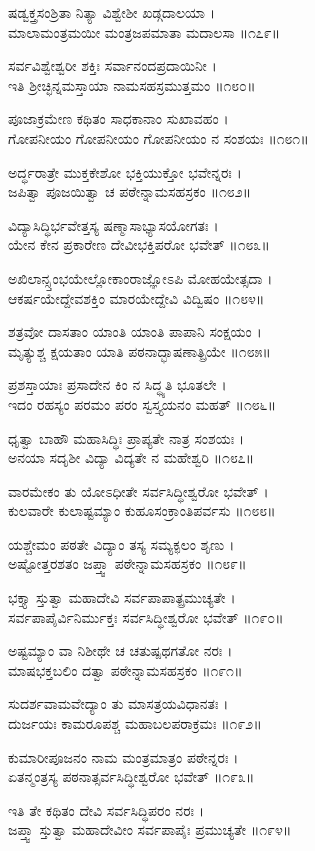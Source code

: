 ಷಡ್ವಕ್ತ್ರಸಂಶ್ರಿತಾ ನಿತ್ಯಾ ವಿಶ್ವೇಶೀ ಖಡ್ಗದಾಲಯಾ ।\\
ಮಾಲಾಮಂತ್ರಮಯೀ ಮಂತ್ರಜಪಮಾತಾ ಮದಾಲಸಾ ॥೧೭೯॥

ಸರ್ವವಿಶ್ವೇಶ್ವರೀ ಶಕ್ತಿಃ ಸರ್ವಾನಂದಪ್ರದಾಯಿನೀ ।\\
ಇತಿ ಶ್ರೀಚ್ಛಿನ್ನಮಸ್ತಾಯಾ ನಾಮಸಹಸ್ರಮುತ್ತಮಂ ॥೧೮೦॥

ಪೂಜಾಕ್ರಮೇಣ ಕಥಿತಂ ಸಾಧಕಾನಾಂ ಸುಖಾವಹಂ ।\\
ಗೋಪನೀಯಂ ಗೋಪನೀಯಂ ಗೋಪನೀಯಂ ನ ಸಂಶಯಃ ॥೧೮೧॥

ಅರ್ದ್ಧರಾತ್ರೇ ಮುಕ್ತಕೇಶೋ ಭಕ್ತಿಯುಕ್ತೋ ಭವೇನ್ನರಃ ।\\
ಜಪಿತ್ವಾ ಪೂಜಯಿತ್ವಾ ಚ ಪಠೇನ್ನಾಮಸಹಸ್ರಕಂ ॥೧೮೨॥

ವಿದ್ಯಾಸಿದ್ಧಿರ್ಭವೇತ್ತಸ್ಯ ಷಣ್ಮಾಸಾಭ್ಯಾಸಯೋಗತಃ ।\\
ಯೇನ ಕೇನ ಪ್ರಕಾರೇಣ ದೇವೀಭಕ್ತಿಪರೋ ಭವೇತ್ ॥೧೮೩॥

ಅಖಿಲಾನ್ಸ್ತಂಭಯೇಲ್ಲೋಕಾಂರಾಜ್ಞೋಽಪಿ ಮೋಹಯೇತ್ಸದಾ ।\\
ಆಕರ್ಷಯೇದ್ದೇವಶಕ್ತಿಂ ಮಾರಯೇದ್ದೇವಿ ವಿದ್ವಿಷಂ ॥೧೮೪॥

ಶತ್ರವೋ ದಾಸತಾಂ ಯಾಂತಿ ಯಾಂತಿ ಪಾಪಾನಿ ಸಂಕ್ಷಯಂ ।\\
ಮೃತ್ಯುಶ್ಚ ಕ್ಷಯತಾಂ ಯಾತಿ ಪಠನಾದ್ಭಾಷಣಾತ್ಪ್ರಿಯೇ ॥೧೮೫॥

ಪ್ರಶಸ್ತಾಯಾಃ ಪ್ರಸಾದೇನ ಕಿಂ ನ ಸಿದ್ಧ್ಯತಿ ಭೂತಲೇ ।\\
ಇದಂ ರಹಸ್ಯಂ ಪರಮಂ ಪರಂ ಸ್ವಸ್ತ್ಯಯನಂ ಮಹತ್ ॥೧೮೬॥

ಧೃತ್ವಾ ಬಾಹೌ ಮಹಾಸಿದ್ಧಿಃ ಪ್ರಾಪ್ಯತೇ ನಾತ್ರ ಸಂಶಯಃ ।\\
ಅನಯಾ ಸದೃಶೀ ವಿದ್ಯಾ ವಿದ್ಯತೇ ನ ಮಹೇಶ್ವರಿ ॥೧೮೭॥

ವಾರಮೇಕಂ ತು ಯೋಽಧೀತೇ ಸರ್ವಸಿದ್ಧೀಶ್ವರೋ ಭವೇತ್ ।\\
ಕುಲವಾರೇ ಕುಲಾಷ್ಟಮ್ಯಾಂ ಕುಹೂಸಂಕ್ರಾಂತಿಪರ್ವಸು ॥೧೮೮॥

ಯಶ್ಚೇಮಂ ಪಠತೇ ವಿದ್ಯಾಂ ತಸ್ಯ ಸಮ್ಯಕ್ಫಲಂ ಶೃಣು ।\\
ಅಷ್ಟೋತ್ತರಶತಂ ಜಪ್ತ್ವಾ ಪಠೇನ್ನಾಮಸಹಸ್ರಕಂ ॥೧೮೯॥

ಭಕ್ತ್ಯಾ ಸ್ತುತ್ವಾ ಮಹಾದೇವಿ ಸರ್ವಪಾಪಾತ್ಪ್ರಮುಚ್ಯತೇ ।\\
ಸರ್ವಪಾಪೈರ್ವಿನಿರ್ಮುಕ್ತಃ ಸರ್ವಸಿದ್ಧೀಶ್ವರೋ ಭವೇತ್ ॥೧೯೦॥

ಅಷ್ಟಮ್ಯಾಂ ವಾ ನಿಶೀಥೇ ಚ ಚತುಷ್ಪಥಗತೋ ನರಃ ।\\
ಮಾಷಭಕ್ತಬಲಿಂ ದತ್ವಾ ಪಠೇನ್ನಾಮಸಹಸ್ರಕಂ ॥೧೯೧॥

ಸುದರ್ಶವಾಮವೇದ್ಯಾಂ ತು ಮಾಸತ್ರಯವಿಧಾನತಃ ।\\
ದುರ್ಜಯಃ ಕಾಮರೂಪಶ್ಚ ಮಹಾಬಲಪರಾಕ್ರಮಃ ॥೧೯೨॥

ಕುಮಾರೀಪೂಜನಂ ನಾಮ ಮಂತ್ರಮಾತ್ರಂ ಪಠೇನ್ನರಃ ।\\
ಏತನ್ಮಂತ್ರಸ್ಯ ಪಠನಾತ್ಸರ್ವಸಿದ್ಧೀಶ್ವರೋ ಭವೇತ್ ॥೧೯೩॥

ಇತಿ ತೇ ಕಥಿತಂ ದೇವಿ ಸರ್ವಸಿದ್ಧಿಪರಂ ನರಃ ।\\
ಜಪ್ತ್ವಾ ಸ್ತುತ್ವಾ ಮಹಾದೇವೀಂ ಸರ್ವಪಾಪೈಃ ಪ್ರಮುಚ್ಯತೇ ॥೧೯೪॥

